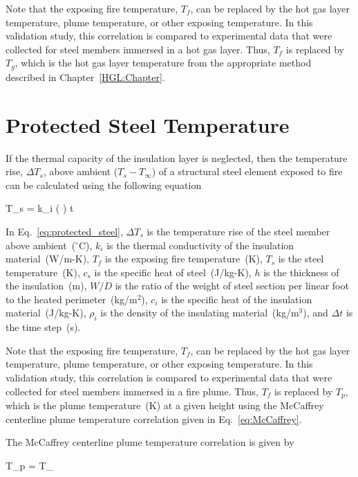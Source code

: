 Note that the exposing fire temperature, $T_f$, can be replaced by the hot gas layer temperature, plume temperature, or other exposing temperature. In this validation study, this correlation is compared to experimental data that were collected for steel members immersed in a hot gas layer. Thus, $T_f$ is replaced by $T_g$, which is the hot gas layer temperature from the appropriate method described in Chapter~\ref{HGL:Chapter}.


\clearpage


\section{Protected Steel Temperature}
\label{info:protected_steel_temperature}

If the thermal capacity of the insulation layer is neglected, then the temperature rise, $\Delta T_s$, above ambient ($T_s - T_\infty$) of a structural steel element exposed to fire can be calculated using the following equation

\be
\Delta T_s = k_i \left(  \right) \Delta t
\label{eq:protected_steel}
\ee

In Eq.~\ref{eq:protected_steel}, $\Delta T_s$ is the temperature rise of the steel member above ambient~($^\circ$C), $k_i$ is the thermal conductivity of the insulation material~(W/m-K), $T_f$ is the exposing fire temperature~(K), $T_s$ is the steel temperature~(K), $c_s$ is the specific heat of steel~(J/kg-K), $h$ is the thickness of the insulation~(m), $W/D$ is the ratio of the weight of steel section per linear foot to the heated perimeter~(kg/m$^2$), $c_i$ is the specific heat of the insulation material~(J/kg-K), $\rho_i$ is the density of the insulating material~(kg/m$^3$), and $\Delta t$ is the time step~(s).

Note that the exposing fire temperature, $T_f$, can be replaced by the hot gas layer temperature, plume temperature, or other exposing temperature. In this validation study, this correlation is compared to experimental data that were collected for steel members immersed in a fire plume. Thus, $T_f$ is replaced by $T_p$, which is the plume temperature~(K) at a given height using the McCaffrey centerline plume temperature correlation given in Eq.~\ref{eq:McCaffrey}.

The McCaffrey centerline plume temperature correlation is given by

\be
\Delta T_p =  T_\infty
\label{eq:McCaffrey}
\ee

